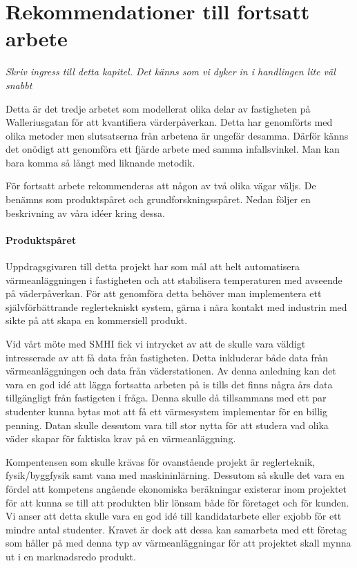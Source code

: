\section{Rekommendationer till fortsatt arbete}

\emph{\color{red} Skriv ingress till detta kapitel. Det känns som vi dyker in i handlingen lite väl snabbt}

Detta är det tredje arbetet som modellerat olika delar av fastigheten på Walleriusgatan för att
kvantifiera värderpåverkan. Detta har genomförts med olika metoder men slutsatserna från arbetena är ungefär desamma.
Därför känns det onödigt att genomföra ett fjärde arbete med samma infallsvinkel. Man kan bara komma så
långt med liknande metodik.

För fortsatt arbete rekommenderas att någon av två olika vägar väljs. De benämns
som produktspåret och grundforskningsspåret. Nedan följer en beskrivning av våra idéer kring dessa.

\paragraph{Produktspåret}
Uppdragsgivaren till detta projekt har som mål att helt automatisera värmeanläggningen i fastigheten och att stabilisera
temperaturen med avseende på väderpåverkan. För att genomföra detta behöver man implementera ett självförbättrande
reglertekniskt system, gärna i nära kontakt med industrin med sikte på att skapa en kommersiell produkt. 

Vid vårt möte med SMHI fick vi intrycket av att de skulle vara väldigt intresserade av att få data från fastigheten.
Detta inkluderar både data från värmeanläggningen och data från väderstationen. Av denna anledning kan det vara
en god idé att lägga fortsatta arbeten på is tills det finns några års data tillgängligt från fastigeten i fråga.
Denna skulle då tillsammans med ett par studenter kunna bytas mot att få ett värmesystem implementar för en billig
penning. Datan skulle dessutom vara till stor nytta för att studera vad olika väder skapar för faktiska
krav på en värmeanläggning. 

Kompentensen som skulle krävas för ovanstående projekt är reglerteknik, fysik/byggfysik samt vana med maskininlärning.
Dessutom så skulle det vara en fördel att kompetens angående ekonomiska beräkningar existerar inom projektet för att
kunna se till att produkten blir lönsam både för företaget och för kunden. Vi anser att detta skulle vara en god
idé till kandidatarbete eller exjobb för ett mindre antal studenter. Kravet är dock att dessa kan samarbeta med
ett företag som håller på med denna typ av värmeanläggningar för att projektet skall mynna ut i en marknadsredo produkt.


